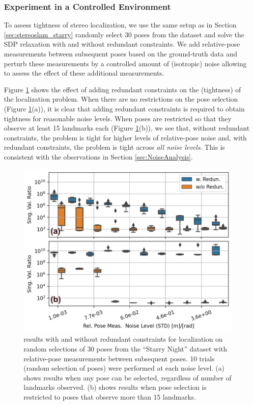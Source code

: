 \subsubsection{Experiment in a Controlled Environment}

To assess tightness of stereo localization, we use the same setup as in Section \ref{sec:stereoslam_starry} randomly select 30 poses from the dataset and solve the SDP relaxation with and without redundant constraints. We add relative-pose measurements between subsequent poses based on the ground-truth data and perturb these measurements by a controlled amount of (isotropic) noise allowing to assess the effect of these additional measurements. 

Figure \ref{fig:d3_loc_box} shows the effect of adding redundant constraints on the  (tightness) of the localization problem. When there are no restrictions on the pose selection (Figure \ref{fig:d3_loc_box}(a)), it is clear that adding redundant constraints is required to obtain tightness for reasonable noise levels. When poses are restricted so that they observe at least 15 landmarks each (Figure \ref{fig:d3_loc_box}(b)), we see that, without redundant constraints, the problem is tight for higher levels of relative-pose noise and, with redundant constraints, the problem is tight across \emph{all noise levels}. This is consistent with the observations in Section \ref{sec:NoiseAnalysis}.


\begin{figure}[!b]
	\centering
	\includegraphics[width=\columnwidth]{figs/loc_box_plots}
	\caption{ results with and without redundant constraints for localization on random selections of 30 poses from the ``Starry Night'' dataset with relative-pose measurements between subsequent poses. 10 trials (random selection of poses) were performed at each noise level. (a) shows results when any pose can be selected, regardless of number of landmarks observed. (b) shows results when pose selection is restricted to poses that observe more than 15 landmarks.}
	\label{fig:d3_loc_box}
\end{figure}
